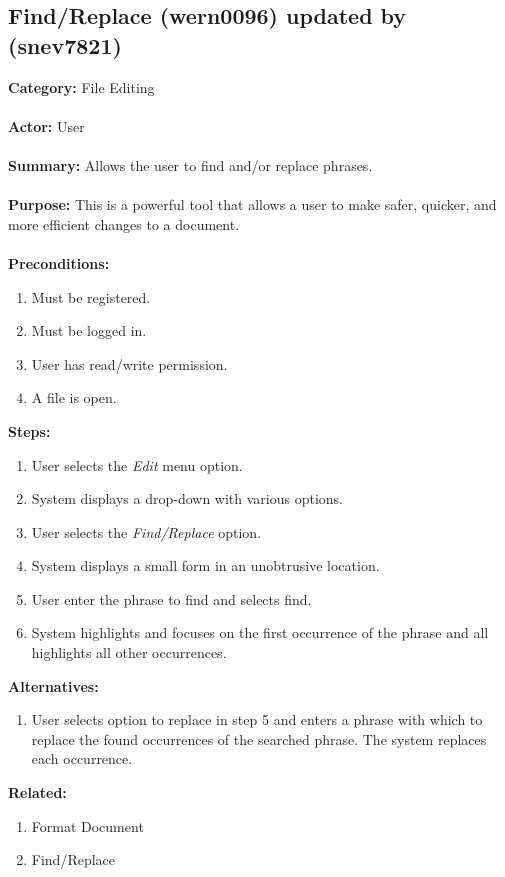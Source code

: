 \documentclass[11pt]{report}
\begin{document}
\newpage

\subsection{Find/Replace (wern0096) updated by (snev7821)}
\begin{framed}

	\textbf{Category:} File Editing \\ \\
	\textbf{Actor:} User \\ \\
	\textbf{Summary:} Allows the user to find and/or replace phrases. \\ \\
	\textbf{Purpose:} This is a powerful tool that allows a user to make safer, quicker, and more efficient changes to a document. \\ \\
	\textbf{Preconditions:} 
	\begin{enumerate}
		\item Must be registered.
		\item Must be logged in.
		\item User has read/write permission.
		\item A file is open.
	\end{enumerate}
	\textbf{Steps:}
	\begin{enumerate}
		\item User selects the \textit{Edit} menu option.
		\item System displays a drop-down with various options.
		\item User selects the \textit{Find/Replace} option.
		\item System displays a small form in an unobtrusive location.
		\item User enter the phrase to find and selects find.
		\item System highlights and focuses on the first occurrence of the phrase and all highlights all other occurrences.
	\end{enumerate}
	\textbf{Alternatives:}
	\begin{enumerate}
		\item User selects option to replace in step 5 and enters a phrase with which to replace the found occurrences of the searched phrase. The system replaces each occurrence.
	\end{enumerate}
	\textbf{Related:}
	\begin{enumerate}
		\item Format Document
		\item Find/Replace
	\end{enumerate}
\end{framed}
\end{document}
